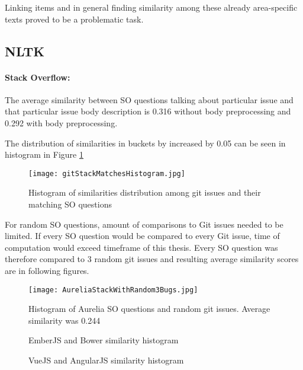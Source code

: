 Linking items and in general finding similarity among these already area-specific texts proved to be a problematic task. 

\subsection{NLTK}
\paragraph{Stack Overflow:}
The average similarity between SO questions talking about particular issue and that particular issue body description is 0.316 without body preprocessing and 0.292 with body preprocessing.

The distribution of similarities in buckets by increased by 0.05 can be seen in histogram in Figure \ref{fig:GitStackMatchesHistogram}

\begin{figure}[H]%
    \centering
	\texttt{[image: gitStackMatchesHistogram.jpg]}
    \caption{Histogram of similarities distribution among git issues and their matching SO questions}%
    \label{fig:GitStackMatchesHistogram}%
\end{figure}

For random SO questions, amount of comparisons to Git issues needed to be limited. If every SO question would be compared to every Git issue, time of computation would exceed timeframe of this thesis. Every SO question was therefore compared to 3 random git issues and resulting average similarity scores are in following figures.

\begin{figure}[H]%
    \centering
	\texttt{[image: AureliaStackWithRandom3Bugs.jpg]}
    \caption{Histogram of Aurelia SO questions and random git issues. Average similarity was 0.244}%
    \label{fig:AureliaStackWithRandom3Bugs}%
\end{figure}


\begin{figure}[H]%
    \centering
    \qquad
    \caption{EmberJS and Bower similarity histogram}%
    \label{fig:BowerEmberWithRandom3Bugs}%
\end{figure}

\begin{figure}[H]%
    \centering
    \qquad
    \caption{VueJS and AngularJS similarity histogram}%
    \label{fig:VueAngularWithRandom3Bugs}%
\end{figure}


